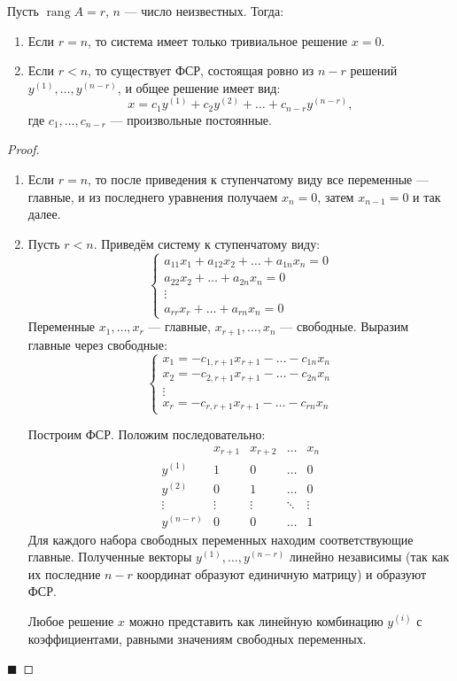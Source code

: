 \begin{theorem}
Пусть $\operatorname{rang} A = r$, $n$ --- число неизвестных. Тогда:
\begin{enumerate}
    \item Если $r = n$, то система имеет только тривиальное решение $x = 0$.
    \item Если $r < n$, то существует ФСР, состоящая ровно из $n - r$ решений $y^{(1)}, \ldots, y^{(n-r)}$, и общее решение имеет вид:
    \[
    x = c_1 y^{(1)} + c_2 y^{(2)} + \ldots + c_{n-r} y^{(n-r)},
    \]
    где $c_1, \ldots, c_{n-r}$ --- произвольные постоянные.
\end{enumerate}
\end{theorem}

\begin{proof}
\begin{enumerate}
    \item Если $r = n$, то после приведения к ступенчатому виду все переменные --- главные, и из последнего уравнения получаем $x_n = 0$, затем $x_{n-1} = 0$ и так далее.
    
    \item Пусть $r < n$. Приведём систему к ступенчатому виду:
    \[
    \begin{cases}
    a_{11}x_1 + a_{12}x_2 + \ldots + a_{1n}x_n = 0 \\
    a_{22}x_2 + \ldots + a_{2n}x_n = 0 \\
    \vdots \\
    a_{rr}x_r + \ldots + a_{rn}x_n = 0
    \end{cases}
    \]
    Переменные $x_1, \ldots, x_r$ --- главные, $x_{r+1}, \ldots, x_n$ --- свободные. Выразим главные через свободные:
    \[
    \begin{cases}
    x_1 = -c_{1,r+1}x_{r+1} - \ldots - c_{1n}x_n \\
    x_2 = -c_{2,r+1}x_{r+1} - \ldots - c_{2n}x_n \\
    \vdots \\
    x_r = -c_{r,r+1}x_{r+1} - \ldots - c_{rn}x_n
    \end{cases}
    \]
    
    Построим ФСР. Положим последовательно:
    \[
    \begin{array}{c|cccc}
    & x_{r+1} & x_{r+2} & \ldots & x_n \\
    \hline
    y^{(1)} & 1 & 0 & \ldots & 0 \\
    y^{(2)} & 0 & 1 & \ldots & 0 \\
    \vdots & \vdots & \vdots & \ddots & \vdots \\
    y^{(n-r)} & 0 & 0 & \ldots & 1
    \end{array}
    \]
    Для каждого набора свободных переменных находим соответствующие главные. Полученные векторы $y^{(1)}, \ldots, y^{(n-r)}$ линейно независимы (так как их последние $n-r$ координат образуют единичную матрицу) и образуют ФСР.
    
    Любое решение $x$ можно представить как линейную комбинацию $y^{(i)}$ с коэффициентами, равными значениям свободных переменных.
\end{enumerate}
\hfill$\blacksquare$
\end{proof}

